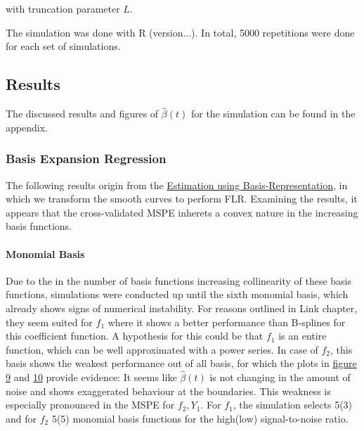 \documentclass[11pt,twoside,a4paper]{article}
\begin{document}
		with truncation parameter $L$.
		\vspace{0.2cm}
	
		The simulation was done with R (version...). In total, 5000 repetitions were done for each set of simulations. 
		
	\subsection{Results}	
	The discussed results and figures of $\hat{\beta}(t)$ for the simulation can be found in the appendix. 
	\subsubsection{Basis Expansion Regression}
	The following results origin from the \hyperref[basis_exp_transf]{Estimation using Basis-Representation}, in which we transform the smooth curves to perform FLR. Examining the results, it appears that the cross-validated MSPE inherets a convex nature in the increasing basis functions.
	
	\paragraph{Monomial Basis}
	Due to the in the number of basis functions increasing collinearity of these basis functions, simulations were conducted up until the sixth monomial basis, which already shows signs of numerical instability. For reasons outlined in {\color{green} Link chapter}, they seem suited for $f_1$ where it shows a better performance than B-splines for this coefficient function. A hypothesis for this could be that $f_1$ is an entire function, which can be well approximated with a power series. In case of $f_2$, this basis shows the weakest performance out of all basis, for which the plots in \hyperref[basis_expansion_2_1]{figure 9} and \hyperref[basis_expansion_2_2]{10} provide evidence: It seems like $\hat{\beta}(t)$ is not changing in the amount of noise and shows exaggerated behaviour at the boundaries. This weakness is especially pronounced in the MSPE for $f_2,Y_1$. For $f_1$, the simulation selects 5(3) and for $f_2$ 5(5) monomial basis functions for the high(low) signal-to-noise ratio. 
	\vspace{-0.2cm}
	
\end{document}
